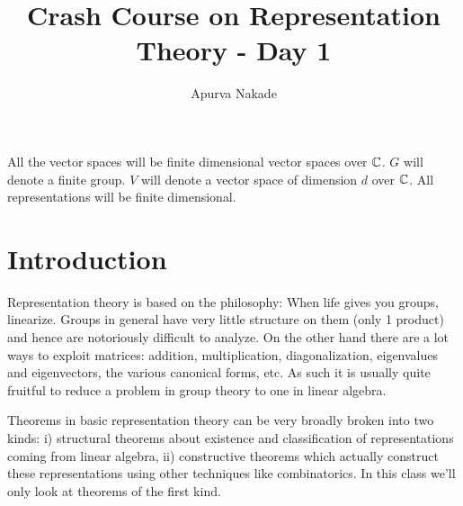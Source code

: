 

\DeclareMathOperator{\Ce}{Re}




\title{Crash Course on Representation Theory - Day 1}
\author{Apurva Nakade}
\thispagestyle{fancy}
\maketitle




All the vector spaces will be finite dimensional vector spaces over $\mathbb{C}$. $G$ will denote a finite group. $V$ will denote a vector space of dimension $d$ over $\mathbb{C}$. All representations will be finite dimensional.

\section{Introduction}
Representation theory is based on the philosophy: When life gives you groups, linearize. Groups in general have very little structure on them (only 1 product) and hence are notoriously difficult to analyze. On the other hand there are a lot ways to exploit matrices: addition, multiplication, diagonalization, eigenvalues and eigenvectors, the various canonical forms, etc. As such it is usually quite fruitful to reduce a problem in group theory to one in linear algebra.

Theorems in basic representation theory can be very broadly broken into two kinds: i) structural theorems about existence and classification of representations coming from linear algebra, ii) constructive theorems which actually construct these representations using other techniques like combinatorics. In this class we'll only look at theorems of the first kind.

